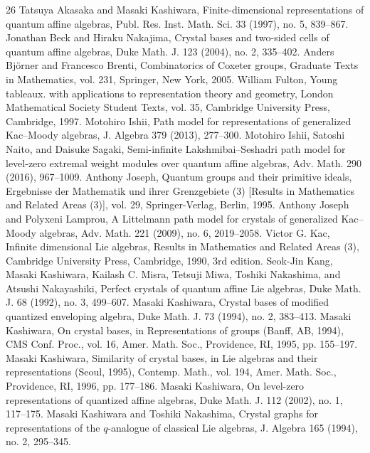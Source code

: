 \begin{thebibliography}{26}
 Tatsuya Akasaka and Masaki Kashiwara, Finite-dimensional representations of quantum affine algebras, Publ. Res. Inst. Math. Sci. 33 (1997), no. 5, 839--867.
 Jonathan Beck and Hiraku Nakajima, Crystal bases and two-sided cells of quantum affine algebras, Duke Math. J. 123 (2004), no. 2, 335--402.
 Anders Björner and Francesco Brenti, Combinatorics of Coxeter groups, Graduate Texts in Mathematics, vol. 231, Springer, New York, 2005.
 William Fulton, Young tableaux. with applications to representation theory and geometry, London Mathematical Society Student Texts, vol. 35, Cambridge University Press, Cambridge, 1997.
 Motohiro Ishii, Path model for representations of generalized Kac--Moody algebras, J. Algebra 379 (2013), 277--300.
 Motohiro Ishii, Satoshi Naito, and Daisuke Sagaki, Semi-infinite Lakshmibai--Seshadri path model for level-zero extremal weight modules over quantum affine algebras, Adv. Math. 290 (2016), 967--1009.
 Anthony Joseph, Quantum groups and their primitive ideals, Ergebnisse der Mathematik und ihrer Grenzgebiete (3) [Results in Mathematics and Related Areas (3)], vol. 29, Springer-Verlag, Berlin, 1995.
 Anthony Joseph and Polyxeni Lamprou, A Littelmann path model for crystals of generalized Kac--Moody algebras, Adv. Math. 221 (2009), no. 6, 2019--2058.
 Victor G. Kac, Infinite dimensional Lie algebras, Results in Mathematics and Related Areas (3), Cambridge University Press, Cambridge, 1990, 3rd edition.
 Seok-Jin Kang, Masaki Kashiwara, Kailash C. Misra, Tetsuji Miwa, Toshiki Nakashima, and Atsushi Nakayashiki, Perfect crystals of quantum affine Lie algebras, Duke Math. J. 68 (1992), no. 3, 499--607.
 Masaki Kashiwara, Crystal bases of modified quantized enveloping algebra, Duke Math. J. 73 (1994), no. 2, 383--413.
 Masaki Kashiwara, On crystal bases, in Representations of groups (Banff, AB, 1994), CMS Conf. Proc., vol. 16, Amer. Math. Soc., Providence, RI, 1995, pp. 155--197.
 Masaki Kashiwara, Similarity of crystal bases, in Lie algebras and their representations (Seoul, 1995), Contemp. Math., vol. 194, Amer. Math. Soc., Providence, RI, 1996, pp. 177--186.
 Masaki Kashiwara, On level-zero representations of quantized affine algebras, Duke Math. J. 112 (2002), no. 1, 117--175.
 Masaki Kashiwara and Toshiki Nakashima, Crystal graphs for representations of the $q$-analogue of classical Lie algebras, J. Algebra 165 (1994), no. 2, 295--345.

\end{thebibliography}
